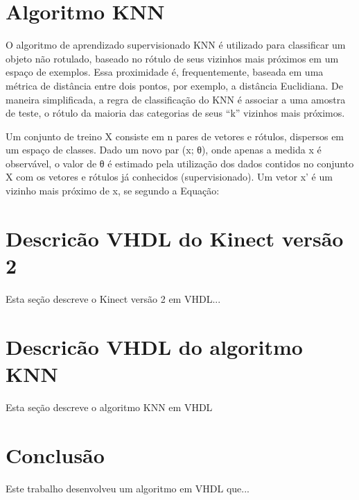 \documentclass[12pt]{article}
\begin{document}
\section{Algoritmo KNN}

O algoritmo de aprendizado supervisionado KNN é utilizado para classificar um
objeto não rotulado, baseado no rótulo de seus vizinhos mais próximos em um
espaço de exemplos. Essa proximidade é, frequentemente, baseada em uma métrica
de distância entre dois pontos, por exemplo, a distância Euclidiana. De maneira
simplificada, a regra de classificação do KNN é associar a uma amostra de
teste, o rótulo da maioria das categorias de seus ``k'' vizinhos mais próximos. 

Um conjunto de treino X consiste em n pares de vetores e rótulos, dispersos em
um espaço de classes. Dado um novo par (x; θ), onde apenas a medida x é
observável, o valor de θ é estimado pela utilização dos dados contidos no
conjunto X com os vetores e rótulos já conhecidos (supervisionado). Um vetor x'
é um vizinho mais próximo de x, se segundo a Equação:


\section{Descric\~ao VHDL do Kinect vers\~ao 2}

Esta seção descreve o Kinect versão 2 em VHDL...

\section{Descric\~ao VHDL do algoritmo KNN}

Esta seção descreve o algoritmo KNN em VHDL


\section{Conclus\~ao}\label{sec:figs}

Este trabalho desenvolveu um algoritmo em VHDL que...


\end{document}

